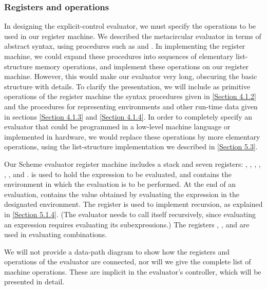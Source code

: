 \subsubsection*{Registers and operations}

In designing the explicit-control evaluator, we must specify the operations to be used in our register machine.
We described the metacircular evaluator in terms of abstract syntax, using procedures such as  and .
In implementing the register machine, we could expand these procedures into sequences of elementary list-structure memory operations, and implement these operations on our register machine.
However, this would make our evaluator very long, obscuring the basic structure with details.
To clarify the presentation, we will include as primitive operations of the register machine the syntax procedures given in \cref{Section 4.1.2} and the procedures for representing environments and other run-time data given in sections \cref{Section 4.1.3} and \cref{Section 4.1.4}.
In order to completely specify an evaluator that could be programmed in a low-level machine language or implemented in hardware, we would replace these operations by more elementary operations, using the list-structure implementation we described in \cref{Section 5.3}.

Our Scheme evaluator register machine includes a stack and seven registers:
, , , , , , and .
 is used to hold the expression to be evaluated, and  contains the environment in which the evaluation is to be performed.
At the end of an evaluation,  contains the value obtained by evaluating the expression in the designated environment.
The  register is used to implement recursion, as explained in \cref{Section 5.1.4}.
(The evaluator needs to call itself recursively, since evaluating an expression requires evaluating its subexpressions.)
The registers , , and  are used in evaluating combinations.

We will not provide a data-path diagram to show how the registers and operations of the evaluator are connected, nor will we give the complete list of machine operations.
These are implicit in the evaluator’s controller, which will be presented in detail.






